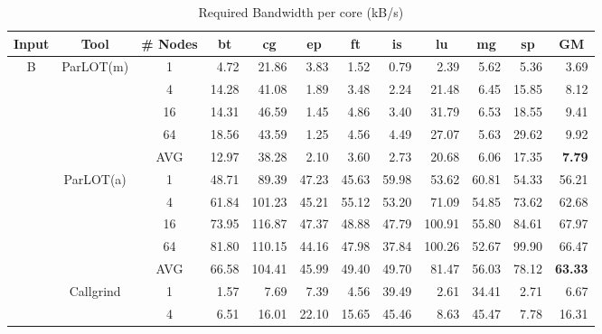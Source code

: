 \begin{table*}[]
\caption{ Required Bandwidth per core (kB/s) }
\label{comet_bw_pMpAcg_BC_itn_p3.5}\begin{center}

\begin{tabular}{|c|c|c|rrrrrrrr|r|}
\hline
Input & Tool & \# Nodes  & \multicolumn{1}{c}{bt} & \multicolumn{1}{c}{cg} & \multicolumn{1}{c}{ep} & \multicolumn{1}{c}{ft} & \multicolumn{1}{c}{is} & \multicolumn{1}{c}{lu} & \multicolumn{1}{c}{mg} & \multicolumn{1}{c|}{sp} & \multicolumn{1}{c|}{GM} \\ \hline
\multirow{15}{*}{B} & \multirow{5}{*}{ParLOT(m)} & 1 &  4.72 &  21.86 &  3.83 &  1.52 &  0.79 &   2.39 &  5.62 &   5.36 &  3.69 \\
 & & 4                                               & 14.28 &  41.08 &  1.89 &  3.48 &  2.24 &  21.48 &  6.45 &  15.85 &  8.12 \\
 & & 16                                              & 14.31 &  46.59 &  1.45 &  4.86 &  3.40 &  31.79 &  6.53 &  18.55 &  9.41 \\
 & & 64                                              & 18.56 &  43.59 &  1.25 &  4.56 &  4.49 &  27.07 &  5.63 &  29.62 &  9.92 \\ \cline{3-12} 
 & & AVG                                             & 12.97 &  38.28 &  2.10 &  3.60 &  2.73 &  20.68 &  6.06 &  17.35 &  \textbf{7.79}  \\ \cline{2-12} 
 & \multirow{5}{*}{ParLOT(a)} & 1 & 48.71 &  89.39 & 47.23 & 45.63 & 59.98 &  53.62 & 60.81 &  54.33 & 56.21 \\
 & & 4                            & 61.84 & 101.23 & 45.21 & 55.12 & 53.20 &  71.09 & 54.85 &  73.62 & 62.68 \\
 & & 16                           & 73.95 & 116.87 & 47.37 & 48.88 & 47.79 & 100.91 & 55.80 &  84.61 & 67.97 \\
 & & 64                           & 81.80 & 110.15 & 44.16 & 47.98 & 37.84 & 100.26 & 52.67 &  99.90 & 66.47 \\ \cline{3-12} 
 & & AVG                          & 66.58 & 104.41 & 45.99 & 49.40 & 49.70 &  81.47 & 56.03 &  78.12 & \textbf{63.33} \\ \cline{2-12} 
 & \multirow{5}{*}{Callgrind}  & 1  &  1.57 &   7.69 &  7.39 &  4.56 & 39.49 &   2.61 & 34.41 &   2.71 &  6.67  \\
 & & 4                              &  6.51 &  16.01 & 22.10 & 15.65 & 45.46 &   8.63 & 45.47 &   7.78 & 16.31  \\

\end{tabular}
\end{center}
\end{table*}
